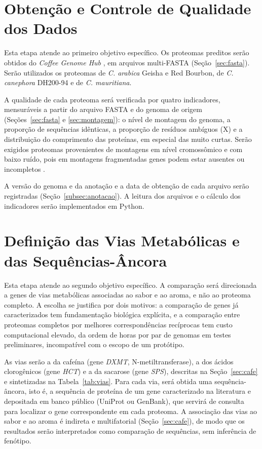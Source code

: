 \section{Obtenção e Controle de Qualidade dos Dados}

Esta etapa atende ao primeiro objetivo específico. Os proteomas preditos serão obtidos do \textit{Coffee Genome Hub} \cite{Dereeper2015, CoffeeHub}, em arquivos multi-FASTA (Seção~\ref{sec:fasta}). Serão utilizados os proteomas de \textit{C. arabica} Geisha e Red Bourbon, de \textit{C. canephora} DH200-94 e de \textit{C. mauritiana}.

A qualidade de cada proteoma será verificada por quatro indicadores, mensuráveis a partir do arquivo FASTA e do genoma de origem (Seções~\ref{sec:fasta} e \ref{sec:montagem}): o nível de montagem do genoma, a proporção de sequências idênticas, a proporção de resíduos ambíguos (X) e a distribuição do comprimento das proteínas, em especial das muito curtas. Serão exigidos proteomas provenientes de montagens em nível cromossômico e com baixo ruído, pois em montagens fragmentadas genes podem estar ausentes ou incompletos \cite{Alkan2011}.

A versão do genoma e da anotação e a data de obtenção de cada arquivo serão registradas (Seção~\ref{subsec:anotacao}). A leitura dos arquivos e o cálculo dos indicadores serão implementados em Python.

\section{Definição das Vias Metabólicas e das Sequências-Âncora}

Esta etapa atende ao segundo objetivo específico. A comparação será direcionada a genes de vias metabólicas associadas ao sabor e ao aroma, e não ao proteoma completo. A escolha se justifica por dois motivos: a comparação de genes já caracterizados tem fundamentação biológica explícita, e a comparação entre proteomas completos por melhores correspondências recíprocas tem custo computacional elevado, da ordem de horas por par de genomas em testes preliminares, incompatível com o escopo de um protótipo.

As vias serão a da cafeína (gene \textit{DXMT}, N-metiltransferase), a dos ácidos clorogênicos (gene \textit{HCT}) e a da sacarose (gene \textit{SPS}), descritas na Seção~\ref{sec:cafe} e sintetizadas na Tabela~\ref{tab:vias}. Para cada via, será obtida uma sequência-âncora, isto é, a sequência de proteína de um gene caracterizado na literatura e depositada em banco público (UniProt ou GenBank), que servirá de consulta para localizar o gene correspondente em cada proteoma. A associação das vias ao sabor e ao aroma é indireta e multifatorial (Seção~\ref{sec:cafe}), de modo que os resultados serão interpretados como comparação de sequências, sem inferência de fenótipo.

